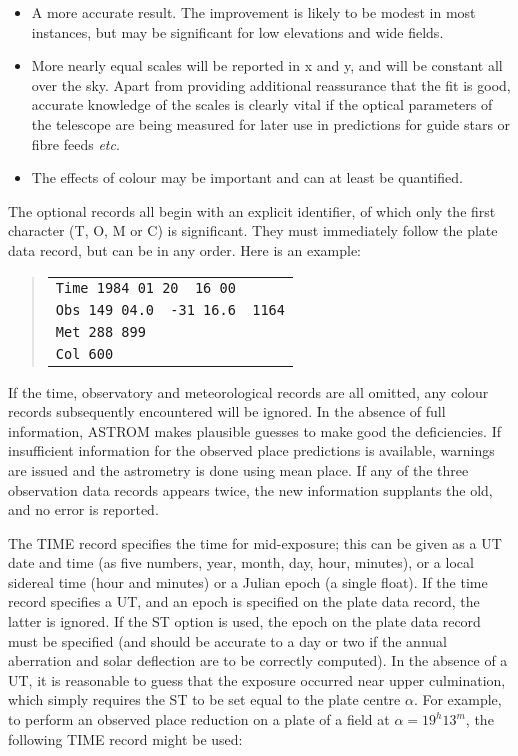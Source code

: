 \documentclass[twoside,11pt]{article}
\renewcommand{\_}{\texttt{\symbol{95}}}
\begin{document}
\begin{itemize}

   \item A more accurate result.  The improvement is likely to be modest
      in most instances, but may be significant for low elevations and
      wide fields.

   \item More nearly equal scales will be reported in x and y, and will be
      constant all over the sky.  Apart from providing additional
      reassurance that the fit is good, accurate knowledge of the scales
      is clearly vital if the optical parameters of the telescope are
      being measured for later use in predictions for guide stars or
      fibre feeds \textit{etc}.

   \item The effects of colour may be important and can at least be
      quantified.

\end{itemize}

The optional records all begin with an explicit identifier, of
which only the first character (T, O, M or C) is significant.
They must immediately follow the plate data record, but
can be in any order.   Here is an example:

\begin{quote}
\begin{tabular}{|l|}
\hline
\verb|Time 1984 01 20  16 00| \\
\verb|Obs 149 04.0  -31 16.6  1164| \\
\verb|Met 288 899| \\
\verb|Col 600| \\
\hline
\end{tabular}
\end{quote}

If the time, observatory and meteorological records are all omitted,
any colour records subsequently encountered will be ignored.  In the
absence of full information, ASTROM makes plausible guesses to make good
the deficiencies.  If insufficient information for the observed place
predictions is available, warnings are issued and the astrometry is done
using mean place.  If any of the three observation data records appears
twice, the new information supplants the old, and no error is reported.

The TIME record specifies the time for mid-exposure; this can be
given as a UT date and time (as five numbers, year, month, day, hour,
minutes), or a local sidereal time (hour and minutes) or a Julian epoch
(a single float).  If the time record specifies
a UT, and an epoch is specified on the plate data record, the latter is
ignored.  If the ST option is used, the epoch on the plate data record
must be specified (and should be accurate to a day or two if the annual
aberration and solar deflection are to be correctly computed).  In the
absence of a UT, it is reasonable to guess that the exposure occurred
near upper culmination, which simply requires the ST to be set equal to
the plate centre $\alpha$.  For example, to perform an observed place
reduction on a plate of a field at $\alpha=19^{h}13^{m}$, the following
TIME record might be used:
\end{document}
